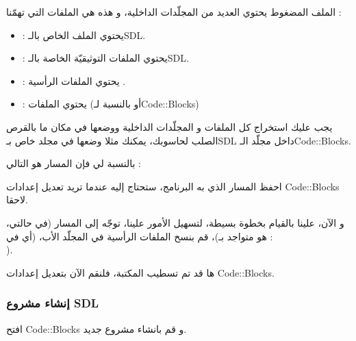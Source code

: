 الملف المضغوط يحتوي العديد من المجلّدات الداخلية، و هذه هي الملفات التي تهمّنا :

\begin{itemize}
	\item {} :
	يحتوي الملف 
	الخاص بالـ\textenglish{SDL}.
	\item {} :
	يحتوي الملفات التوثيقيّة الخاصة بالـ\textenglish{SDL}.
	\item {} :
	يحتوي الملفات الرأسية
	.
	\item {} :
	يحتوي الملفات 
	(أو
	بالنسبة لـ\textenglish{Code::Blocks})
\end{itemize}

يجب عليك استخراج كل الملفات و المجلّدات الداخلية ووضعها في مكان ما بالقرص الصلب لحاسوبك، يمكنك مثلا وضعها في مجلد خاص بـ\textenglish{SDL}
داخل مجلّد الـ\textenglish{Code::Blocks}.


بالنسبة لي فإن المسار هو التالي :


احفظ المسار الذي به البرنامج، ستحتاج إليه عندما تريد تعديل إعدادات 
\textenglish{Code::Blocks}
لاحقا.

و الآن، علينا بالقيام بخطوة بسيطة، لتسهيل الأمور علينا، توجّه إلى المسار
(في حالتي، هو متواجد بـ)،
قم بنسخ الملفات الرأسية
 في المجلّد الأب، (أي في :\\ 
).


ها قد تم تسطيب المكتبة، فلنقم الآن بتعديل إعدادات
\textenglish{Code::Blocks}.

\subsubsection{إنشاء مشروع \textenglish{SDL}}

افتح
\textenglish{Code::Blocks}
و قم بانشاء مشروع جديد.


